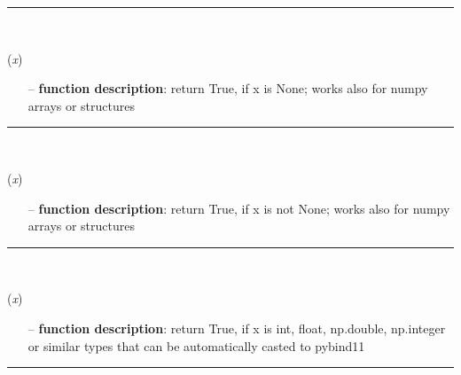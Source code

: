 \begin{itemize}[leftmargin=1.4cm]
\begin{itemize}[leftmargin=0.7cm]
\vspace{12pt}\end{itemize}
%
\noindent\rule{8cm}{0.75pt}\vspace{1pt} \\ 
\begin{flushleft}
\label{sec:advancedUtilities:IsNone}
({\it x})
\end{flushleft}
\setlength{\itemindent}{0.7cm}
\begin{itemize}[leftmargin=0.7cm]
\item[--]
{\bf function description}: return True, if x is None; works also for numpy arrays or structures
\vspace{12pt}\end{itemize}
%
\noindent\rule{8cm}{0.75pt}\vspace{1pt} \\ 
\begin{flushleft}
\label{sec:advancedUtilities:IsNotNone}
({\it x})
\end{flushleft}
\setlength{\itemindent}{0.7cm}
\begin{itemize}[leftmargin=0.7cm]
\item[--]
{\bf function description}: return True, if x is not None; works also for numpy arrays or structures
\vspace{12pt}\end{itemize}
%
\noindent\rule{8cm}{0.75pt}\vspace{1pt} \\ 
\begin{flushleft}
\label{sec:advancedUtilities:IsValidBool}
({\it x})
\end{flushleft}
\setlength{\itemindent}{0.7cm}
\begin{itemize}[leftmargin=0.7cm]
\item[--]
{\bf function description}: return True, if x is int, float, np.double, np.integer or similar types that can be automatically casted to pybind11
\vspace{12pt}\end{itemize}
%
\noindent\rule{8cm}{0.75pt}\vspace{1pt} \\ 

\end{itemize}
